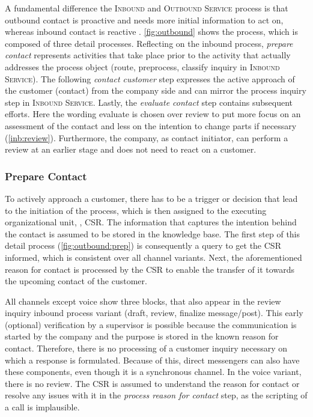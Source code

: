 	 A fundamental difference the \textsc{Inbound} and \textsc{Outbound} \textsc{Service} process is that outbound contact is proactive and needs more initial information to act on, whereas inbound contact is reactive \citep{DimensionData2015}. \Fig \ref{fig:outbound} shows the process, which is composed of three detail processes. Reflecting on the inbound process,  \textit{prepare contact} represents activities that take place prior to the activity that actually addresses the process object (route, preprocess, classify inquiry in \textsc{Inbound Service}). The following \textit{contact customer} step expresses the active approach of the customer (contact) from the company side and can mirror the process inquiry step in \textsc{Inbound Service}. Lastly, the \textit{evaluate contact} step contains subsequent efforts. Here the wording evaluate is chosen over review to put more focus on an assessment of the contact and less on the intention to change parts if necessary (\cf \ref{inb:review}). Furthermore, the company, as contact initiator, can perform a review at an earlier stage and does not need to react on a customer. 
	 
	 
	 \subsubsection{Prepare Contact}
	 
	 To actively approach a customer, there has to be a trigger or decision that lead to the initiation of the process, which is then assigned to the executing organizational unit, \eg, \acrshort{CSR}. The information that captures the intention behind the contact is assumed to be stored in the knowledge base. The first step of this detail process (\Fig \ref{fig:outbound:prep}) is consequently a query to get the \acrshort{CSR} informed, which is consistent over all channel variants. Next, the aforementioned reason for contact is processed by the \acrshort{CSR} to enable the transfer of it towards the upcoming contact of the customer. 
	 
	 All channels except voice show three blocks, that also appear in the review inquiry inbound process variant (draft, review, finalize message/post). This early (optional) verification by a supervisor is possible because the communication is started by the company and the purpose is stored in the known reason for contact. Therefore, there is no processing of a customer inquiry necessary on which a response is formulated. Because of this, direct messengers can also have these components, even though it is a synchronous channel. In the voice variant, there is no review. The \acrshort{CSR} is assumed to understand the reason for contact or resolve any issues with it in the \textit{process reason for contact} step, as the scripting of a call is implausible. 
	 
